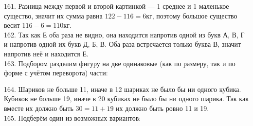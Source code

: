 \documentclass[12pt]{article}
\begin{document}
161. Разница между первой и второй картинкой --- 1 среднее и 1 маленькое существо, значит их сумма равна $122-116=6$кг, поэтому большое существо весит $116-6=110$кг.\\
162. Так как Е оба раза не видно, она находится напротив одной из букв А, В, Г и напротив одной их букв Д, Б, В. Оба раза встречается только буква В, значит напротив неё и находится Е.\\
163. Подбором разделим фигуру на две одинаковые (как по размеру, так и по форме с учётом переворота) части:
\begin{center}
\begin{figure}[ht!]
\end{figure}
\end{center}
164. Шариков не больше 11, иначе в 12 шариках не было бы ни одного кубика. Кубиков не больше 19, иначе в 20 кубиках не было бы ни одного шарика. Так как вместе их должно быть $30=11+19$ их должно быть ровно 11 и 19.\\
165. Подберём один из возможных вариантов:
\begin{center}
\begin{figure}[ht!]
\end{figure}
\end{center}
\end{document}
